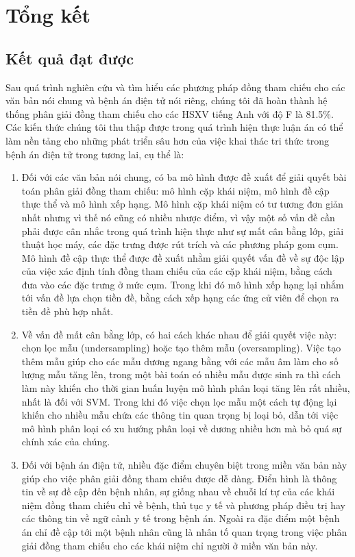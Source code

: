 \chapter{Tổng kết}

\section{Kết quả đạt được}
Sau quá trình nghiên cứu và tìm hiểu các phương pháp đồng tham chiếu cho các văn bản nói chung và bệnh án điện tử nói riêng, chúng tôi đã hoàn thành hệ thống phân giải đồng tham chiếu cho các HSXV tiếng Anh với độ F là 81.5\%. Các kiến thức chúng tôi thu thập được trong quá trình hiện thực luận án có thể làm nền tảng cho những phát triển sâu hơn của việc khai thác tri thức trong bệnh án điện tử trong tương lai, cụ thể là:
\begin{enumerate}
\item Đối với các văn bản nói chung, có ba mô hình được đề xuất để giải quyết bài toán phân giải đồng tham chiếu: mô hình cặp khái niệm, mô hình đề cập thực thể và mô hình xếp hạng. Mô hình cặp khái niệm có tư tương đơn giản nhất nhưng vì thế nó cũng có nhiều nhược điểm, vì vậy một số vấn đề cần phải được cân nhắc trong quá trình hiện thực như sự mất cân bằng lớp, giải thuật học máy, các đặc trưng được rút trích và các phương pháp gom cụm. Mô hình đề cập thực thể được đề xuất nhằm giải quyết vấn đề về sự độc lập của việc xác định tính đồng tham chiếu của các cặp khái niệm, bằng cách đưa vào các đặc trưng ở mức cụm. Trong khi đó mô hình xếp hạng lại nhắm tới vấn đề lựa chọn tiền đề, bằng cách xếp hạng các ứng cử viên để chọn ra tiền đề phù hợp nhất. 
\item Về vấn đề mất cân bằng lớp, có hai cách khác nhau để giải quyết việc này: chọn lọc mẫu (undersampling) hoặc tạo thêm mẫu (oversampling). Việc tạo thêm mẫu giúp cho các mẫu dương ngang bằng với các mẫu âm làm cho số lượng mẫu tăng lên, trong một bài toán có nhiều mẫu được sinh ra thì cách làm này khiến cho thời gian huấn luyện mô hình phân loại tăng lên rất nhiều, nhất là đối với SVM. Trong khi đó việc chọn lọc mẫu một cách tự động lại khiến cho nhiều mẫu chứa các thông tin quan trọng bị loại bỏ, dẫn tới việc mô hình phân loại có xu hướng phân loại về dương nhiều hơn mà bỏ quá sự chính xác của chúng.
\item Đối với bệnh án điện tử, nhiều đặc điểm chuyên biệt trong miền văn bản này giúp cho việc phân giải đồng tham chiếu được dễ dàng. Điển hình là thông tin về sự đề cập đến bệnh nhân, sự giống nhau về chuỗi kí tự của các khái niệm đồng tham chiếu chỉ về bệnh, thủ tục y tế và phương pháp điều trị hay các thông tin về ngữ cảnh y tế trong bệnh án. Ngoài ra đặc điểm một bệnh án chỉ đề cập tới một bệnh nhân cũng là nhân tố quan trọng trong việc phân giải đồng tham chiếu cho các khái niệm chỉ người ở miền văn bản này.
\end{enumerate}

